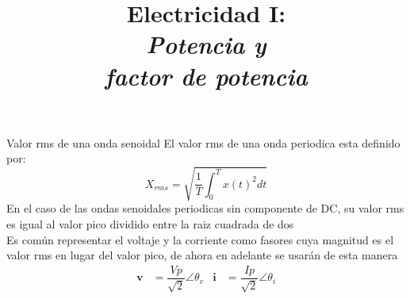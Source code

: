 \documentclass[aspectratio=169]{beamer}
\title{
    Electricidad I:\\
    \alert{\emph{Potencia y}}\\
    \alert{\emph{factor de potencia}}
}
\begin{document}


\begin{frame}{Valor rms de una onda senoidal}
El valor rms de una onda periodica esta definido por:\\[4pt]
    \begin{equation*}
        X_{rms} = \sqrt{\dfrac{1}{T}\int^T_0 x(t)^2dt}
    \end{equation*}
En el caso de las ondas senoidales periodicas sin componente de DC, su valor rms es igual al valor pico dividido entre la raiz cuadrada de dos\\[4pt]
Es común representar el voltaje y la corriente como fasores cuya magnitud es el valor rms en lugar del valor pico, de ahora en adelante se usarán de esta manera
    \begin{align*}
        \bm{v} &= \dfrac{Vp}{\sqrt{2}}\angle \theta_v & \bm{i} &= \dfrac{Ip}{\sqrt{2}}\angle \theta_i
    \end{align*}
\end{frame}
\end{document}
